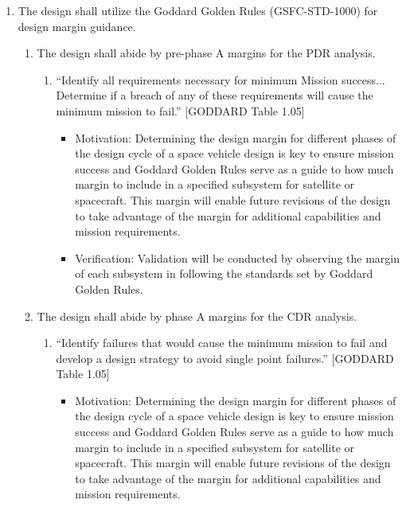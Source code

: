 \begin{enumerate}
\begin{enumerate}
\begin{enumerate}
\begin{itemize}
                            \item Verification: Test to ensure the chosen sensor and its accompanying components are within the design specifications in the Table \ref{tab:blackbox}. 
                        \end{itemize}
                    \end{enumerate}
            \end{enumerate}
    \item The design shall utilize the Goddard Golden Rules (GSFC-STD-1000) for design margin guidance.
        \begin{enumerate}
            \item The design shall abide by pre-phase A margins for the PDR analysis.
                \begin{enumerate}
                    \item “Identify all requirements necessary for minimum Mission success... Determine if a breach of any of these requirements will cause the minimum mission to fail.” [GODDARD Table 1.05]
                        \begin{itemize}
                            \item Motivation: Determining the design margin for different phases of the design cycle of a space vehicle design is key to ensure mission success and Goddard Golden Rules serve as a guide to how much margin to include in a specified subsystem for satellite or spacecraft. This margin will enable future revisions of the design to take advantage of the margin for additional capabilities and mission requirements. 
                            \item Verification: Validation will be conducted by observing the margin of each subsystem in following the standards set by Goddard Golden Rules.   \end{itemize}
                \end{enumerate}
            \item The design shall abide by phase A margins for the CDR analysis.
                \begin{enumerate}
                    \item “Identify failures that would cause the minimum mission to fail and develop a design strategy to avoid single point failures.” [GODDARD Table 1.05] 
                        \begin{itemize}
                            \item Motivation: Determining the design margin for different phases of the design cycle of a space vehicle design is key to ensure mission success and Goddard Golden Rules serve as a guide to how much margin to include in a specified subsystem for satellite or spacecraft. This margin will enable future revisions of the design to take advantage of the margin for additional capabilities and mission requirements. 

\end{itemize}
\end{enumerate}
\end{enumerate}
\end{enumerate}
